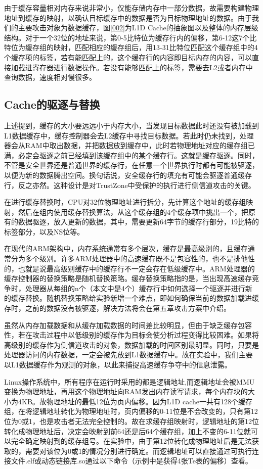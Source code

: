 由于缓存容量相对内存来说非常小，仅能存储内存中一部分数据，故需要构建物理地址到缓存的映射，以确认目标缓存中的数据是否为目标物理地址的数据。由于我们的主要攻击对象为数据缓存，图\ref{002}为L1D Cache的抽象图以及整体的内存层级结构。对于一个32位的地址来说，第0-5比特位为缓存行内的偏移，第6-12这7个比特位为缓存组的映射，匹配相应的缓存组后，用13-31比特位匹配这个缓存组中的4个缓存项的标签，若有能匹配上的，这个缓存行的内容即目标内存的内容，可以直接加载进寄存器进行数据操作。若没有能够匹配上的标签，需要去L2或者内存中查询数据，速度相对慢很多。


\subsection{Cache的驱逐与替换}

上述提到，缓存的大小要远远小于内存大小，当发现目标数据此时还没有被加载到L1数据缓存中，缓存控制器会去L2缓存中寻找目标数据。若此时仍未找到，处理器会从RAM中取出数据，并把数据放到缓存中，此时若物理地址对应的缓存组已满，必定会驱逐之前已经填到该缓存组中的某个缓存行。这就是缓存驱逐。同时，不管是安全世界还是普通世界的缓存行，在任意一个世界执行时都有可能被驱逐，以便为新的数据腾出空间。换句话说，安全缓存行的填充有可能会驱逐普通缓存行，反之亦然。这种设计是对TrustZone中受保护的执行进行侧信道攻击的关键。

在进行缓存替换时，CPU对32位物理地址进行拆分，先计算这个地址的缓存组映射，然后在组内使用缓存替换算法，从这个缓存组的4个缓存项中挑出一个，把原有的数据驱逐，放入更新的数据，其中，需要更新64字节的缓存行部分，19比特的标签部分，以及NS位等。

在现代的ARM架构中，内存系统通常有多个层次，缓存是最高级别的，且缓存通常分为多个级别。许多ARM处理器中的高速缓存既不是包容性的，也不是排他性的，也就是说最高级别缓存中的缓存行不一定会存在低级缓存中。ARM处理器的缓存控制器的替换策略是随机替换策略。缓存替换策略指的是，当出现高速缓存竞争时，处理器从每组的n个（本文中是4个）缓存行中如何选择一个驱逐并进行新的缓存替换。随机替换策略给实验新增一个难点，即如何确保当前的数据加载进缓存时，之前的数据没有被驱逐，解决方法将会在第五章攻击方案中介绍。

虽然从内存加载数据和从缓存加载数据的时间差比较明显，但由于缺乏缓存包容性，若在攻击过程中以低级别的缓存作为目标会使分析过程变得比较困难。如果将高级别的缓存作为侧信道攻击的对象，数据加载的时间区别最明显。同时，只要是处理器访问的内存数据，一定会被先放到L1数据缓存中。故在实验中，我们主要以L1数据缓存作为观测的对象，以此来捕捉高速缓存争夺中的信息泄露。

Linux操作系统中，所有程序在运行时采用的都是逻辑地址,而逻辑地址会被MMU变换为物理地址，再用这个物理地址向RAM发出内存读写请求，每个内存块的大小为4KB。故物理地址的最低12位为页内偏移。因为L1D cache一共有128个缓存组，在将逻辑地址转化为物理地址时，页内偏移的0-11位是不会改变的，只有第12位为0或1，也是攻击者无法完全控制的。故在求缓存组映射时，逻辑地址的第12位转化成物理地址后，决定会映射到前64还是后64个缓存组，加上不变的6-11位就可以完全确定映射到的缓存组号。在实验中，由于第12位转化成物理地址后是无法获取的，需要对该位为0或1的情况分别进行确定。而逻辑地址可以直接通过可执行连接文件.elf或动态链接库.so通过以下命令（示例中是获得4张Te表的偏移）查看。

